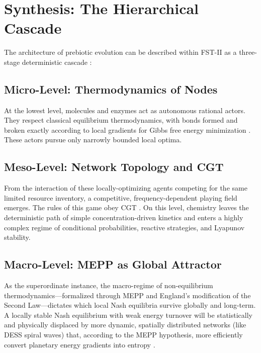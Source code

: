 \documentclass[12pt,a4paper]{article}
\theoremstyle{remark}
\begin{document}
\section{Synthesis: The Hierarchical Cascade}
\label{sec:synthesis}

The architecture of prebiotic evolution can be described within FST-II as a three-stage deterministic cascade \citep{ThermodynamicsLife}:

\subsection{Micro-Level: Thermodynamics of Nodes}

At the lowest level, molecules and enzymes act as autonomous rational actors. They respect classical equilibrium thermodynamics, with bonds formed and broken exactly according to local gradients for Gibbs free energy minimization \citep{MetabolicNash}. These actors pursue only narrowly bounded local optima.

\subsection{Meso-Level: Network Topology and CGT}

From the interaction of these locally-optimizing agents competing for the same limited resource inventory, a competitive, frequency-dependent playing field emerges. The rules of this game obey CGT \citep{AzoarcusPNAS}. On this level, chemistry leaves the deterministic path of simple concentration-driven kinetics and enters a highly complex regime of conditional probabilities, reactive strategies, and Lyapunov stability.

\subsection{Macro-Level: MEPP as Global Attractor}

As the superordinate instance, the macro-regime of non-equilibrium thermodynamics---formalized through MEPP and England's modification of the Second Law---dictates which local Nash equilibria survive globally and long-term. A locally stable Nash equilibrium with weak energy turnover will be statistically and physically displaced by more dynamic, spatially distributed networks (like DESS spiral waves) that, according to the MEPP hypothesis, more efficiently convert planetary energy gradients into entropy \citep{EntropyMEPP}.
\end{document}
